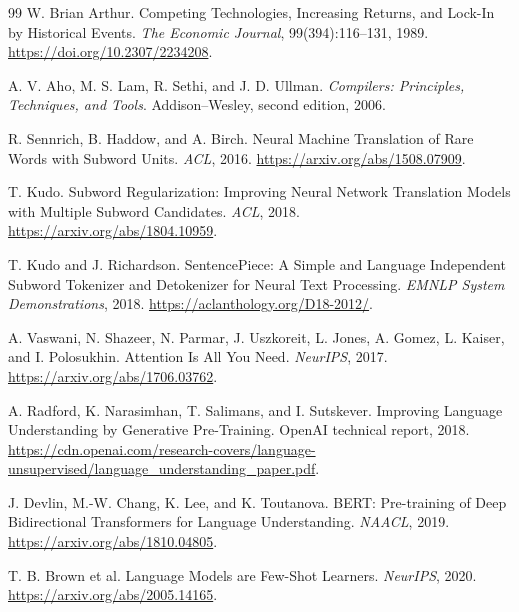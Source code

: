 \documentclass[11pt,twoside]{article}
\theoremstyle{plain}
\theoremstyle{definition}
\theoremstyle{remark}
\begin{document}
\clearpage
\begin{thebibliography}{99}
W. Brian Arthur.
\newblock Competing Technologies, Increasing Returns, and Lock-In by
Historical Events.
\newblock \emph{The Economic Journal}, 99(394):116--131, 1989.
\newblock \url{https://doi.org/10.2307/2234208}.

A. V. Aho, M. S. Lam, R. Sethi, and J. D. Ullman.
\newblock \emph{Compilers: Principles, Techniques, and Tools}.
\newblock Addison--Wesley, second edition, 2006.

R. Sennrich, B. Haddow, and A. Birch.
\newblock Neural Machine Translation of Rare Words with Subword Units.
\newblock \emph{ACL}, 2016.
\newblock \url{https://arxiv.org/abs/1508.07909}.

T. Kudo.
\newblock Subword Regularization: Improving Neural Network Translation Models
with Multiple Subword Candidates.
\newblock \emph{ACL}, 2018.
\newblock \url{https://arxiv.org/abs/1804.10959}.

T. Kudo and J. Richardson.
\newblock SentencePiece: A Simple and Language Independent Subword Tokenizer
and Detokenizer for Neural Text Processing.
\newblock \emph{EMNLP System Demonstrations}, 2018.
\newblock \url{https://aclanthology.org/D18-2012/}.

A. Vaswani, N. Shazeer, N. Parmar, J. Uszkoreit, L. Jones, A. Gomez,
L. Kaiser, and I. Polosukhin.
\newblock Attention Is All You Need.
\newblock \emph{NeurIPS}, 2017.
\newblock \url{https://arxiv.org/abs/1706.03762}.

A. Radford, K. Narasimhan, T. Salimans, and I. Sutskever.
\newblock Improving Language Understanding by Generative Pre-Training.
\newblock OpenAI technical report, 2018.
\newblock \url{https://cdn.openai.com/research-covers/language-unsupervised/language_understanding_paper.pdf}.

J. Devlin, M.-W. Chang, K. Lee, and K. Toutanova.
\newblock BERT: Pre-training of Deep Bidirectional Transformers for Language
Understanding.
\newblock \emph{NAACL}, 2019.
\newblock \url{https://arxiv.org/abs/1810.04805}.

T. B. Brown et al.
\newblock Language Models are Few-Shot Learners.
\newblock \emph{NeurIPS}, 2020.
\newblock \url{https://arxiv.org/abs/2005.14165}.


\end{thebibliography}
\end{document}
